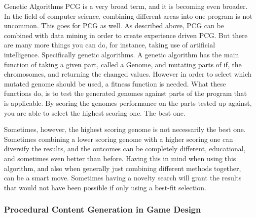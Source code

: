Genetic Algorithms
PCG is a very broad term, and it is becoming even broader. In the field of computer science, combining different areas into one program is not uncommon. This goes for PCG as well. As described above, PCG can be combined with data mining in order to create experience driven PCG. But there are many more things you can do, for instance, taking use of artificial intelligence. Specifically genetic algorithms. A genetic algorithm has the main function of taking a given part, called a Genome, and mutating parts of if, the chromosomes, and returning the changed values. However in order to select which mutated genome should be used, a fitness function is needed. What these functions do, is to test the generated genomes against parts of the program that is applicable. By scoring the genomes performance on the parts tested up against, you are able to select the highest scoring one. The best one. 

Sometimes, however, the highest scoring genome is not necessarily the best one. Sometimes combining a lower scoring genome with a higher scoring one can diversify the results, and the outcomes can be completely different, educational, and sometimes even better than before. Having this in mind when using this algorithm, and also when generally just combining different methods together, can be a smart move. Sometimes having a novelty search will grant the results that would not have been possible if only using a best-fit selection.

\subsubsection{Procedural Content Generation in Game Design}

